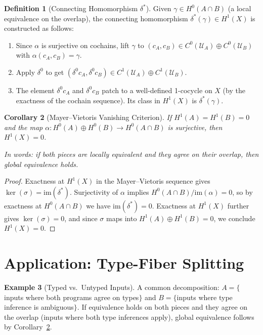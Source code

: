 \documentclass[11pt,a4paper]{report}
\theoremstyle{definition}
\newtheorem{definition}{Definition}[chapter]
\newtheorem{example}[definition]{Example}
\theoremstyle{plain}
\newtheorem{corollary}[definition]{Corollary}
\newcommand{\covers}{\mathcal{U}}
\newcommand{\Hzero}{H^0}
\newcommand{\Hone}{H^1}
\begin{document}
\begin{definition}[Connecting Homomorphism $\delta^*$]
\label{def:connecting-hom}
Given $\gamma \in \Hzero(A \cap B)$ (a local equivalence on the
overlap), the connecting homomorphism $\delta^*(\gamma) \in \Hone(X)$
is constructed as follows:
\begin{enumerate}
  \item Since $\alpha$ is surjective on cochains, lift $\gamma$ to
    $(c_A, c_B) \in C^0(\covers_A) \oplus C^0(\covers_B)$ with
    $\alpha(c_A, c_B) = \gamma$.
  \item Apply $\delta^0$ to get $(\delta^0 c_A, \delta^0 c_B) \in
    C^1(\covers_A) \oplus C^1(\covers_B)$.
  \item The element $\delta^0 c_A$ and $\delta^0 c_B$ patch to a
    well-defined 1-cocycle on $X$ (by the exactness of the cochain
    sequence).  Its class in $\Hone(X)$ is $\delta^*(\gamma)$.
\end{enumerate}
\end{definition}

\begin{corollary}[Mayer--Vietoris Vanishing Criterion]
\label{cor:mv-vanishing}
If $\Hone(A) = \Hone(B) = 0$ and the map $\alpha : \Hzero(A) \oplus
\Hzero(B) \to \Hzero(A \cap B)$ is surjective, then $\Hone(X) = 0$.

In words: if both pieces are locally equivalent and they agree on
their overlap, then global equivalence holds.
\end{corollary}

\begin{proof}
Exactness at $\Hone(X)$ in the Mayer--Vietoris sequence gives
$\ker(\sigma) = \mathrm{im}(\delta^*)$.  Surjectivity of $\alpha$
implies $\Hzero(A \cap B) / \mathrm{im}(\alpha) = 0$, so by
exactness at $\Hzero(A \cap B)$ we have $\mathrm{im}(\delta^*) = 0$.
Exactness at $\Hone(X)$ further gives $\ker(\sigma) = 0$, and since
$\sigma$ maps into $\Hone(A) \oplus \Hone(B) = 0$, we conclude
$\Hone(X) = 0$.
\end{proof}

\section{Application: Type-Fiber Splitting}

\begin{example}[Typed vs.\ Untyped Inputs]
\label{ex:mv-typed}
A common decomposition: $A = \{$inputs where both programs agree
on types$\}$ and $B = \{$inputs where type inference is ambiguous$\}$.
If equivalence holds on both pieces and they agree on the overlap
(inputs where both type inferences apply), global equivalence follows
by Corollary~\ref{cor:mv-vanishing}.
\end{example}
\end{document}
